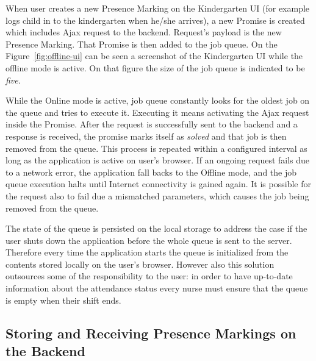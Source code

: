 When user creates a new Presence Marking on the Kindergarten UI (for example logs child in to the kindergarten when he/she arrives), a new Promise is created which includes Ajax request to the backend. Request's payload is the new Presence Marking. That Promise is then added to the job queue. On the Figure~\ref{fig:offline-ui} can be seen a screenshot of the Kindergarten UI while the offline mode is active. On that figure the size of the job queue is indicated to be \textit{five}.

While the Online mode is active, job queue constantly looks for the oldest job on the queue and tries to execute it. Executing it means activating the Ajax request inside the Promise. After the request is successfully sent to the backend and a response is received, the promise marks itself as \textit{solved} and that job is then removed from the queue. This process is repeated within a configured interval as long as the application is active on user's browser. If an ongoing request fails due to a network error, the application fall backs to the Offline mode, and the job queue execution halts until Internet connectivity is gained again. It is possible for the request also to fail due a mismatched parameters, which causes the job being removed from the queue.

The state of the queue is persisted on the local storage to address the case if the user shuts down the application before the whole queue is sent to the server. Therefore every time the application starts the queue is initialized from the contents stored locally on the user's browser. However also this solution outsources some of the responsibility to the user: in order to have up-to-date information about the attendance status every nurse must ensure that the queue is empty when their shift ends.  %









\subsection{Storing and Receiving Presence Markings on the Backend}
\label{subsec:backend-implementation}

